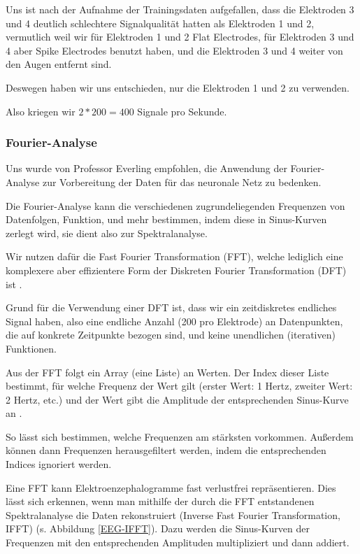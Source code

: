 \documentclass{scrartcl}
\begin{document}
	Uns ist nach der Aufnahme der Trainingsdaten aufgefallen, dass die Elektroden 3 und 4 deutlich schlechtere Signalqualität hatten als Elektroden 1 und 2, vermutlich weil wir für Elektroden 1 und 2 Flat Electrodes, für Elektroden 3 und 4 aber Spike Electrodes benutzt haben, und die Elektroden 3 und 4 weiter von den Augen entfernt sind.

	Deswegen haben wir uns entschieden, nur die Elektroden 1 und 2 zu verwenden.

	Also kriegen wir $2 * 200 = 400$ Signale pro Sekunde.

	\subsubsection{Fourier-Analyse}
	
	Uns wurde von Professor Everling empfohlen, die Anwendung der Fourier-Analyse zur Vorbereitung der Daten für das neuronale Netz zu bedenken.
	
	Die Fourier-Analyse kann die verschiedenen zugrundeliegenden Frequenzen von Datenfolgen, Funktion, und mehr bestimmen, indem diese in Sinus-Kurven zerlegt wird, sie dient also zur Spektralanalyse.

	Wir nutzen dafür die Fast Fourier Transformation (FFT), welche lediglich eine komplexere aber effizientere Form der Diskreten Fourier Transformation (DFT) ist \cite{FFT-DFT}.

	Grund für die Verwendung einer DFT ist, dass wir ein zeitdiskretes endliches Signal haben, also eine endliche Anzahl (200 pro Elektrode) an Datenpunkten, die auf konkrete Zeitpunkte bezogen sind, und keine unendlichen (iterativen) Funktionen.

	Aus der FFT folgt ein Array (eine Liste) an Werten. Der Index dieser Liste bestimmt, für welche Frequenz der Wert gilt (erster Wert: 1 Hertz, zweiter Wert: 2 Hertz, etc.) und der Wert gibt die Amplitude der entsprechenden Sinus-Kurve an \cite{3b1b:fft}.

	So lässt sich bestimmen, welche Frequenzen am stärksten vorkommen. Außerdem können dann Frequenzen herausgefiltert werden, indem die entsprechenden Indices ignoriert werden.

	Eine FFT kann Elektroenzephalogramme fast verlustfrei repräsentieren. Dies lässt sich erkennen, wenn man mithilfe der durch die FFT entstandenen Spektralanalyse die Daten rekonstruiert (Inverse Fast Fourier Transformation, IFFT) (s. Abbildung \ref{EEG-IFFT}). Dazu werden die Sinus-Kurven der Frequenzen mit den entsprechenden Amplituden multipliziert und dann addiert.
\end{document}
